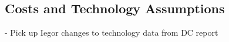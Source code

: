\subsection{Costs and Technology Assumptions}\label{sec:costs}
- Pick up Iegor changes to technology data from DC report
\tbd
